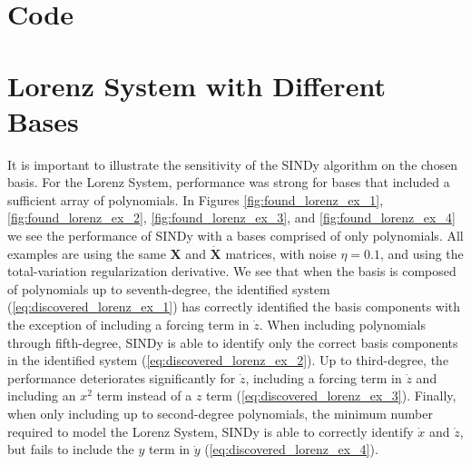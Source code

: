 \documentclass[10pt]{paper}
\begin{document}
\appendix 
\newpage
\section{Code} \label{apx:code}


\newpage 
\section{Lorenz System with Different Bases} \label{apx:lorenz_with_diff_bases}
It is important to illustrate the sensitivity of the SINDy algorithm on the chosen basis. For the Lorenz System, performance was strong for bases that included a sufficient array of polynomials. 
In Figures \ref{fig:found_lorenz_ex_1}, \ref{fig:found_lorenz_ex_2}, \ref{fig:found_lorenz_ex_3}, and \ref{fig:found_lorenz_ex_4} we see the performance of SINDy with a bases comprised of only polynomials. 
All examples are using the same $\mathbf X$ and $\mathbf {\dot X}$ matrices, with noise $\eta = 0.1$, and using the total-variation regularization derivative.
We see that when the basis is composed of polynomials up to seventh-degree, the identified system (\ref{eq:discovered_lorenz_ex_1}) has correctly identified the basis components with the exception of including a forcing term in $\dot z$. 
When including polynomials through fifth-degree, SINDy is able to identify only the correct basis components in the identified system (\ref{eq:discovered_lorenz_ex_2}). 
Up to third-degree, the performance deteriorates significantly for $\dot z$, including a forcing term in $\dot z$ and including an $x^2$ term instead of a $z$ term (\ref{eq:discovered_lorenz_ex_3}).  
Finally, when only including up to second-degree polynomials, the minimum number required to model the Lorenz System, SINDy is able to correctly identify $\dot x$ and $\dot z$, but fails to include the $y$ term in $\dot y$ (\ref{eq:discovered_lorenz_ex_4}). 
\end{document}
